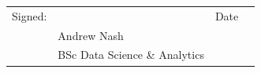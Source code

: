 \documentclass[9pt,conference]{IEEEtran}
\begin{document}
\vspace{5cm}

\begin{tabular}{@{}p{.5in}p{2in}p{.5in}p{2in}@{}}
Signed: & \hrulefill  & Date &  \hrulefill  \\
& Andrew Nash & &\\
& BSc Data Science \& Analytics & &\\
\end{tabular}
\end{document}
